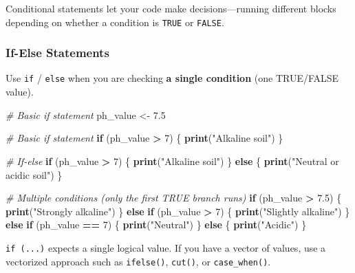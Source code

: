 \documentclass[
  10pt,
  b5paper,
  oneside]{book}
\newenvironment{Shaded}{\begin{snugshade}}{\end{snugshade}}
\newcommand{\CommentTok}[1]{\textcolor[rgb]{0.56,0.35,0.01}{\textit{#1}}}
\newcommand{\ControlFlowTok}[1]{\textcolor[rgb]{0.13,0.29,0.53}{\textbf{#1}}}
\newcommand{\DecValTok}[1]{\textcolor[rgb]{0.00,0.00,0.81}{#1}}
\newcommand{\FloatTok}[1]{\textcolor[rgb]{0.00,0.00,0.81}{#1}}
\newcommand{\FunctionTok}[1]{\textcolor[rgb]{0.13,0.29,0.53}{\textbf{#1}}}
\newcommand{\NormalTok}[1]{#1}
\newcommand{\OtherTok}[1]{\textcolor[rgb]{0.56,0.35,0.01}{#1}}
\newcommand{\SpecialCharTok}[1]{\textcolor[rgb]{0.81,0.36,0.00}{\textbf{#1}}}
\newcommand{\StringTok}[1]{\textcolor[rgb]{0.31,0.60,0.02}{#1}}
\begin{document}
Conditional statements let your code make decisions---running different blocks depending on whether a condition is \texttt{TRUE} or \texttt{FALSE}.

\subsubsection{If-Else Statements}\label{ifelse-statements}

Use \texttt{if} / \texttt{else} when you are checking \textbf{a single condition} (one TRUE/FALSE value).

\begin{Shaded}
\begin{Highlighting}[]
\CommentTok{\# Basic if statement}
\NormalTok{ph\_value }\OtherTok{\textless{}{-}} \FloatTok{7.5}

\CommentTok{\# Basic if statement}
\ControlFlowTok{if}\NormalTok{ (ph\_value }\SpecialCharTok{\textgreater{}} \DecValTok{7}\NormalTok{) \{}
  \FunctionTok{print}\NormalTok{(}\StringTok{"Alkaline soil"}\NormalTok{)}
\NormalTok{\}}

\CommentTok{\# If{-}else}
\ControlFlowTok{if}\NormalTok{ (ph\_value }\SpecialCharTok{\textgreater{}} \DecValTok{7}\NormalTok{) \{}
  \FunctionTok{print}\NormalTok{(}\StringTok{"Alkaline soil"}\NormalTok{)}
\NormalTok{\} }\ControlFlowTok{else}\NormalTok{ \{}
  \FunctionTok{print}\NormalTok{(}\StringTok{"Neutral or acidic soil"}\NormalTok{)}
\NormalTok{\}}

\CommentTok{\# Multiple conditions (only the first TRUE branch runs)}
\ControlFlowTok{if}\NormalTok{ (ph\_value }\SpecialCharTok{\textgreater{}} \FloatTok{7.5}\NormalTok{) \{}
  \FunctionTok{print}\NormalTok{(}\StringTok{"Strongly alkaline"}\NormalTok{)}
\NormalTok{\} }\ControlFlowTok{else} \ControlFlowTok{if}\NormalTok{ (ph\_value }\SpecialCharTok{\textgreater{}} \DecValTok{7}\NormalTok{) \{}
  \FunctionTok{print}\NormalTok{(}\StringTok{"Slightly alkaline"}\NormalTok{)}
\NormalTok{\} }\ControlFlowTok{else} \ControlFlowTok{if}\NormalTok{ (ph\_value }\SpecialCharTok{==} \DecValTok{7}\NormalTok{) \{}
  \FunctionTok{print}\NormalTok{(}\StringTok{"Neutral"}\NormalTok{)}
\NormalTok{\} }\ControlFlowTok{else}\NormalTok{ \{}
  \FunctionTok{print}\NormalTok{(}\StringTok{"Acidic"}\NormalTok{)}
\NormalTok{\}}
\end{Highlighting}
\end{Shaded}

\texttt{if\ (...)} expects a single logical value.
If you have a vector of values, use a vectorized approach such as \texttt{ifelse()}, \texttt{cut()}, or \texttt{case\_when()}.
\end{document}

